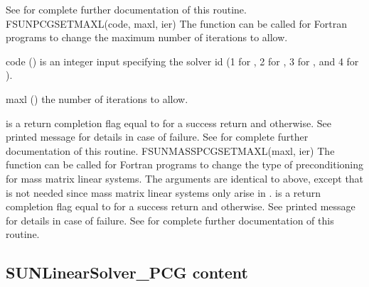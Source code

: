 {
  See  for complete further documentation of
  this routine.
}
%
%
{
  FSUNPCGSETMAXL(code, maxl, ier)
}
{
  The function  can be called for Fortran
  programs to change the maximum number of iterations to allow.
}
{
  \begin{args}[maxl]
  \item[code] ()
    is an integer input specifying the solver id (1 for {\cvode}, 2
    for {\ida}, 3 for {\kinsol}, and 4 for {\arkode}).
  \item[maxl] ()
    the number of iterations to allow.
  \end{args}
}
{
   is a  return completion flag equal to  for a success
  return and  otherwise. See printed message for details in case
  of failure.
}
{
  See  for complete further
  documentation of this routine.
}
%
%
{
  FSUNMASSPCGSETMAXL(maxl, ier)
}
{
  The function  can be called for Fortran
  programs to change the type of preconditioning for mass matrix
  linear systems.
}
{
  The arguments are identical to  above, except that
   is not needed since mass matrix linear systems only arise
  in {\arkode}.
}
{
   is a  return completion flag equal to  for a success
  return and  otherwise. See printed message for details in case
  of failure.
}
{
  See  for complete further
  documentation of this routine.
}
%
%

\subsection{SUNLinearSolver\_PCG content}
\label{ss:sunlinsol_pcg_content}

